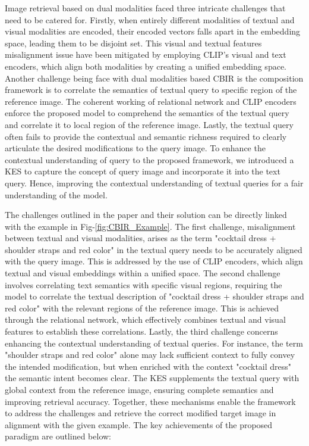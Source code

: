 \documentclass[10pt,lineno]{wlpeerj}
\begin{document}
\par Image retrieval based on dual modalities faced three intricate challenges that need to be catered for. Firstly, when entirely different modalities of textual and visual modalities are encoded, their encoded vectors falls apart in the embedding space, leading them to be disjoint set. This visual and textual features misalignment issue have been mitigated by employing CLIP’s visual and text encoders, which align both modalities by creating a unified embedding space. Another challenge being face with dual modalities based CBIR is the composition framework is to correlate the semantics of textual query to specific region of the reference image. The coherent working of relational network and CLIP encoders enforce the proposed model to comprehend the semantics of the textual query and correlate it to local region of the reference image. Lastly, the textual query often fails to provide the contextual and semantic richness required to clearly articulate the desired modifications to the query image. To enhance the contextual understanding of query to the proposed framework, we introduced a KES to capture the concept of query image and incorporate it into the text query. Hence, improving the contextual understanding of textual queries for a fair understanding of the model. 

 The challenges outlined in the paper and their solution can be directly linked with the example in Fig-\ref{fig:CBIR_Example}. The first challenge, misalignment between textual and visual modalities, arises as the term "cocktail dress + shoulder straps and red color" in the textual query needs to be accurately aligned with the query image. This is addressed by the use of CLIP encoders, which align textual and visual embeddings within a unified space. The second challenge involves correlating text semantics with specific visual regions, requiring the model to correlate the textual description of "cocktail dress + shoulder straps and red color" with the relevant regions of the reference image. This is achieved through the relational network, which effectively combines textual and visual features to establish these correlations.  Lastly, the third challenge concerns enhancing the contextual understanding of textual queries. For instance, the term "shoulder straps and red color" alone may lack sufficient context to fully convey the intended modification, but when enriched with the context "cocktail dress" the semantic intent becomes clear. The KES supplements the textual query with global context from the reference image, ensuring complete semantics and improving retrieval accuracy.  Together, these mechanisms enable the framework to address the challenges and retrieve the correct modified target image in alignment with the given example. \color{black} The key achievements of the proposed paradigm are outlined below: \color{black}
\end{document}
